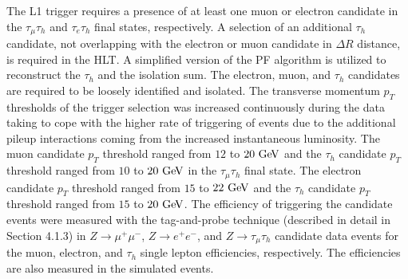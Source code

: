 The L1 trigger requires a presence of at least one muon or electron candidate in the $\tau_{\mu}\tau_{h}$ and $\tau_{e}\tau_{h}$ final states, respectively. A selection of an additional $\tau_h$ candidate, not overlapping with the electron or muon candidate in $\Delta R$ distance, is required in the HLT.  A simplified version of the PF algorithm is utilized to reconstruct the $\tau_h$ and the isolation sum. The  electron, muon, and $\tau_h$ candidates are required to be loosely identified and isolated. The transverse momentum $p_{T}$ thresholds of the trigger selection was increased continuously during the data taking to cope with the higher rate of triggering of events due to the additional pileup interactions coming from the increased instantaneous luminosity. The muon candidate $p_{T}$ threshold ranged from $12$ to $20~\mathrm{Ge\kern -0.1em V}$ and the $\tau_h$ candidate $p_{T}$  threshold ranged from $10$ to $20~\mathrm{Ge\kern -0.1em V}$ in the $\tau_{\mu}\tau_{h}$ final state. The electron candidate $p_{T}$ threshold ranged from $15$ to $22~\mathrm{Ge\kern -0.1em V}$ and the $\tau_h$ candidate  $p_{T}$  threshold ranged from $15$ to $20~\mathrm{Ge\kern -0.1em V}$. The efficiency of triggering the candidate events were measured with the tag-and-probe technique (described in detail in Section 4.1.3) in $Z \rightarrow \mu^{+}\mu^{-}$,  $Z \rightarrow e^{+}e^{-}$, and $Z \rightarrow \tau_{\mu}\tau_h$ candidate data events for the muon, electron, and $\tau_h$ single lepton efficiencies, respectively. The efficiencies are also measured in the simulated events. 

